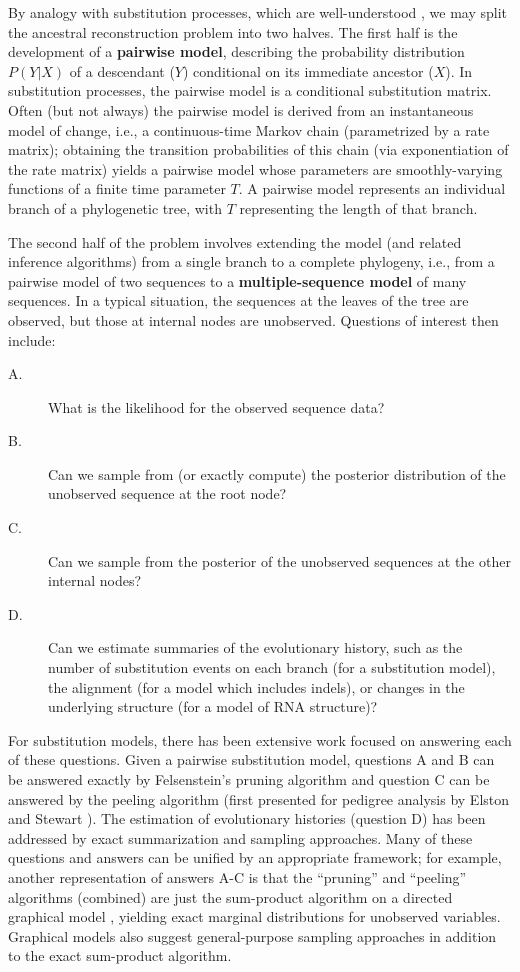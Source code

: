 \documentclass[10pt]{article}
\begin{document}
By analogy with substitution processes, which are well-understood \cite{Felsenstein2003},
we may split the ancestral reconstruction problem into two halves.
The first half is the development of a {\bf pairwise model},
describing the probability distribution $P(Y|X)$ of a descendant ($Y$) conditional on its immediate ancestor ($X$).
In substitution processes, the pairwise model is a conditional substitution matrix.
Often (but not always) the pairwise model is derived from an instantaneous model of change,
i.e., a continuous-time Markov chain (parametrized by a rate matrix);
obtaining the transition probabilities of this chain (via exponentiation of the rate matrix)
yields a pairwise model whose parameters are smoothly-varying functions of a finite time parameter $T$.
A pairwise model represents an individual branch of a phylogenetic tree, with $T$ representing the length of that branch.

The second half of the problem involves extending the model (and related inference algorithms) from a single branch to a complete phylogeny,
i.e., from a pairwise model of two sequences to a {\bf multiple-sequence model} of many sequences.
In a typical situation, the sequences at the leaves of the tree are observed, but those at internal nodes are unobserved.
Questions of interest then include:
\begin{description}
\item[A.] What is the likelihood for the observed sequence data?
\item[B.] Can we sample from (or exactly compute) the posterior distribution of the unobserved sequence at the root node?
\item[C.] Can we sample from the posterior of the unobserved sequences at the other internal nodes?
\item[D.] Can we estimate summaries of the evolutionary history, such as
  the number of substitution events on each branch (for a substitution
  model), the alignment (for a model which includes indels), or
  changes in the underlying structure (for a model of RNA structure)?
\end{description}

For substitution models, there has been extensive work focused on answering each of these questions.
Given a pairwise substitution model, questions A and B can be
answered exactly by Felsenstein's pruning algorithm
\cite{Felsenstein81} and question C can be answered by the peeling
algorithm (first presented for pedigree analysis by Elston and Stewart \cite{ElstonStewart71}).
The estimation of evolutionary histories (question D) has been
addressed by exact summarization \cite{HolmesRubin2002b} and sampling
\cite{Nielsen2001} approaches.
Many of these questions and answers can be unified by an
appropriate framework;
for example, another representation of answers A-C
is that the ``pruning'' and ``peeling'' algorithms (combined) are just
the sum-product algorithm on a directed graphical model \cite{Pearl82},
yielding exact marginal distributions for unobserved variables.
Graphical models also suggest general-purpose sampling approaches
in addition to the exact sum-product algorithm.
\end{document}
